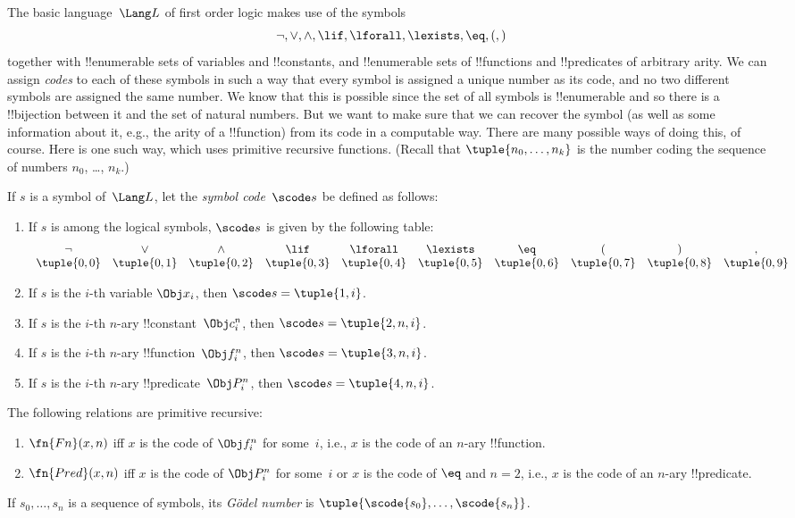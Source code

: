 \documentclass[../../include/open-logic-section]{subfiles}
\begin{document}

The basic language~$\Lang L$ of first order logic makes use of the symbols
\[
\lnot, \lor, \land, \lif, \lforall, \lexists, \eq, (, )
\]
together with !!{enumerable} sets of variables and !!{constant}s, and
!!{enumerable} sets of !!{function}s and !!{predicate}s of arbitrary
arity.  We can assign \emph{codes} to each of these symbols in such a
way that every symbol is assigned a unique number as its code, and no
two different symbols are assigned the same number.  We know that this
is possible since the set of all symbols is !!{enumerable} and so
there is a !!{bijection} between it and the set of natural numbers.
But we want to make sure that we can recover the symbol (as well as
some information about it, e.g., the arity of a !!{function}) from its
code in a computable way.  There are many possible ways of doing this,
of course.  Here is one such way, which uses primitive recursive
functions.  (Recall that $\tuple{n_0, \dots, n_k}$ is the number
coding the sequence of numbers $n_0$, \dots, $n_k$.)

\begin{defn}
If $s$ is a symbol of~$\Lang L$, let the \emph{symbol code}~$\scode s$ be
defined as follows:
\begin{enumerate}
\item If $s$ is among the logical symbols, $\scode s$ is given by the
  following table:
\[
\begin{array}{cccccccccc}
\lnot & \lor & \land & \lif & \lforall & \lexists & \eq & ( & ) & ,\\
\tuple{0, 0} & \tuple{0, 1} & \tuple{0, 2} & \tuple{0, 3} & 
\tuple{0, 4} & \tuple{0, 5} & \tuple{0, 6} & \tuple{0, 7} &
\tuple{0, 8} & \tuple{0, 9} 
\end{array}
\]
\item If $s$ is the $i$-th variable $\Obj x_i$, then $\scode s = \tuple{1, i}$.
\item If $s$ is the $i$-th $n$-ary !!{constant}~$\Obj c_i^n$, then
  $\scode s = \tuple{2, n, i}$.
\item If $s$ is the $i$-th $n$-ary !!{function}~$\Obj f_i^n$, then
  $\scode s = \tuple{3, n, i}$.
\item If $s$ is the $i$-th $n$-ary !!{predicate}~$\Obj P_i^n$, then
  $\scode s = \tuple{4, n, i}$.
\end{enumerate}
\end{defn}

\begin{prop}
The following relations are primitive recursive:
\begin{enumerate}
\item $\fn{Fn}(x, n)$ iff $x$ is the code of $\Obj f^n_i$ for
  some~$i$, i.e., $x$ is the code of an $n$-ary !!{function}.
\item $\fn{Pred}(x, n)$ iff $x$ is the code of $\Obj P^n_i$ for
  some~$i$ or $x$ is the code of $\eq$ and $n = 2$, i.e., $x$ is the
  code of an $n$-ary !!{predicate}.
\end{enumerate}
\end{prop}

\begin{defn}
If $s_0, \dots, s_n$ is a sequence of symbols, its
\emph{G\"odel number} is $\tuple{\scode{s_0}, \dots, \scode{s_n}}$.
\end{defn}
\end{document}
